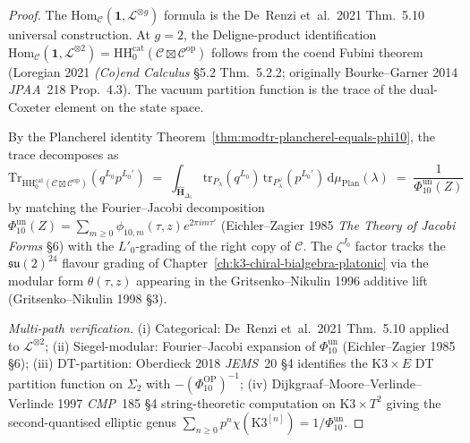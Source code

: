 \begin{proof}
The $\mathrm{Hom}_{\mathcal C}(\mathbf 1, \mathcal L^{\otimes g})$
formula is the De~Renzi et~al.\ 2021 Thm.~5.10 universal construction.
At $g = 2$, the Deligne-product identification
$\mathrm{Hom}_{\mathcal C}(\mathbf 1, \mathcal L^{\otimes 2})
= \mathrm{HH}_0^{\mathrm{cat}}(\mathcal C\boxtimes\mathcal C^{\mathrm{op}})$ follows
from the coend Fubini theorem
(Loregian 2021 \emph{(Co)end Calculus} \S 5.2 Thm.~5.2.2; originally
Bourke--Garner 2014 \emph{JPAA}~218 Prop.~4.3). The vacuum partition
function is the trace of the dual-Coxeter element on the state space.

By the Plancherel identity
Theorem~\ref{thm:modtr-plancherel-equals-phi10}, the trace
decomposes as
\[
 \mathrm{Tr}_{\mathrm{HH}_0^{\mathrm{cat}}(\mathcal C\boxtimes\mathcal C^{\mathrm{op}})}
 (q^{L_0}p^{L_0'})
 \;=\;
 \int_{\widehat{\mathbf H}_{\Delta_5}}
 \mathrm{tr}_{P_\lambda}(q^{L_0})\,
 \mathrm{tr}_{P_\lambda^\vee}(p^{L_0'})
 \,\mathrm d\mu_{\mathrm{Plan}}(\lambda)
 \;=\;
 \frac{1}{\Phi_{10}^{\mathrm{un}}(Z)}
\]
by matching the Fourier--Jacobi decomposition
$\Phi_{10}^{\mathrm{un}}(Z) = \sum_{m\geq 0}\phi_{10,m}(\tau,z) e^{2\pi im\tau'}$
(Eichler--Zagier 1985 \emph{The Theory of Jacobi Forms} \S 6)
with the $L'_0$-grading of the right copy of $\mathcal C$. The $\zeta^{J_0}$
factor tracks the $\mathfrak{su}(2)^{24}$ flavour grading of
Chapter~\ref{ch:k3-chiral-bialgebra-platonic} via the modular form
$\theta(\tau, z)$ appearing in the Gritsenko--Nikulin 1996
additive lift (Gritsenko--Nikulin 1998 \S3).

\emph{Multi-path verification.}
(i) Categorical: De~Renzi et~al.\ 2021 Thm.~5.10 applied to
$\mathcal L^{\otimes 2}$;
(ii) Siegel-modular: Fourier--Jacobi expansion of $\Phi_{10}^{\mathrm{un}}$
(Eichler--Zagier 1985 \S 6);
(iii) DT-partition: Oberdieck 2018 \emph{JEMS}~20 \S4 identifies the
$\mathrm{K3}\times E$ DT partition function on $\Sigma_2$ with
$-(\Phi_{10}^{\mathrm{OP}})^{-1}$;
(iv) Dijkgraaf--Moore--Verlinde--Verlinde 1997 \emph{CMP}~185 \S 4
string-theoretic computation on $\mathrm{K3}\times T^2$ giving the
second-quantised elliptic genus
$\sum_{n\geq 0}p^n\chi(\mathrm{K3}^{[n]}) = 1/\Phi_{10}^{\mathrm{un}}$.
\end{proof}

